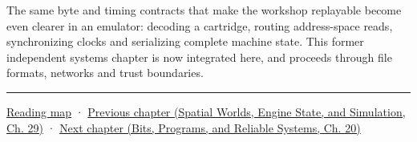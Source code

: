 The same byte and timing contracts that make the workshop replayable become even clearer in an emulator: decoding a cartridge, routing address-space reads, synchronizing clocks and serializing complete machine state. This former independent systems chapter is now integrated here, and proceeds through file formats, networks and trust boundaries.

\begin{center}\rule{0.5\linewidth}{0.5pt}\end{center}

\hyperref[volume-reading-map]{Reading map} · \href{../05-Spatial-Worlds-Engine-State-and-Simulation/main.pdf\#nameddest=06-engine-ii-ch040-coupled-contacts-and-iterative-response}{Previous chapter (Spatial Worlds, Engine State, and Simulation, Ch. 29)} · \href{../01-Bits-Programs-and-Reliable-Systems/main.pdf\#nameddest=06-engine-ii-ch042-from-cartridge-bytes-to-a-reproducible-machine}{Next chapter (Bits, Programs, and Reliable Systems, Ch. 20)}
